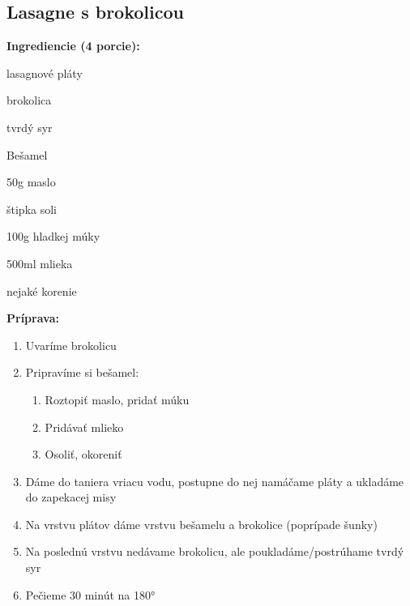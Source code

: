 \setcounter{step}{0}

\subsection{ Lasagne s brokolicou }

\begin{ingredient}
  
  \def\portions{  }
  \textbf{ {\normalsize Ingrediencie (4 porcie):} }

  \begin{main}
      \item lasagnové pláty
      \item brokolica
      \item tvrdý syr
  \end{main}
  
    \begin{subingredient}{Bešamel}
        \item 50g maslo
        \item štipka soli
        \item 100g hladkej múky
        \item 500ml mlieka
        \item nejaké korenie
    \end{subingredient}
  
\end{ingredient}
\begin{recipe}
\textbf{ {\normalsize Príprava:} }
\begin{enumerate}

  \item{Uvaríme brokolicu}
  \item{Pripravíme si bešamel: }
      \begin{enumerate}
          \item{Roztopiť maslo, pridať múku}
          \item{Pridávať mlieko}
          \item{Osoliť, okoreniť}\end{enumerate}
  \item{Dáme do taniera vriacu vodu, postupne do nej namáčame pláty a ukladáme do zapekacej misy}
  \item{Na vrstvu plátov dáme vrstvu bešamelu a brokolice (poprípade šunky)}
  \item{Na poslednú vrstvu nedávame brokolicu, ale poukladáme/postrúhame tvrdý syr}
  \item{Pečieme 30 minút na 180°}

\end{enumerate}
\end{recipe}

\begin{notes}
  
\end{notes}	
\clearpage
